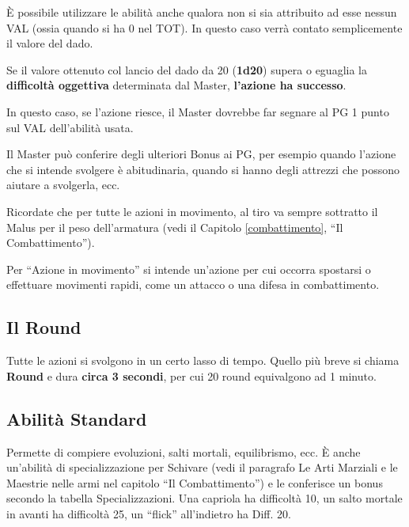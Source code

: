\bigskip
{}  

\`E possibile utilizzare le abilit\`a anche qualora non si sia
attribuito ad esse nessun VAL (ossia quando si ha 0 nel TOT). In
questo caso verr\`a contato semplicemente il valore del dado.
  
Se il valore ottenuto col lancio del dado da 20 (\textbf{1d20}) supera
o eguaglia la \textbf{difficolt\`a oggettiva} determinata dal Master,
\textbf{l'azione ha successo}.
  
In questo caso, se l'azione riesce, il Master dovrebbe far segnare al
PG 1 punto sul VAL dell'abilit\`a usata.

Il Master pu\`o conferire degli ulteriori Bonus ai PG, per esempio
quando l'azione che si intende svolgere \`e abitudinaria, quando si
hanno degli attrezzi che possono aiutare a svolgerla, ecc.

Ricordate che per tutte le azioni in movimento, al tiro va sempre
sottratto il Malus per il peso dell'armatura (vedi il Capitolo
\ref{combattimento}, ``Il Combattimento'').

Per ``Azione in movimento'' si intende un'azione per cui occorra
spostarsi o effettuare movimenti rapidi, come un attacco o una difesa
in combattimento.

\subsection{Il Round}

Tutte le azioni si svolgono in un certo lasso di tempo. Quello pi\`u
breve si chiama \textbf{Round} e dura \textbf{circa 3 secondi}, per
cui 20 round equivalgono ad 1 minuto. 

\subsection{Abilit\`a Standard}

\iffullversion
{} Permette di compiere evoluzioni, salti
mortali, equilibrismo, ecc. \`E anche un'abilit\`a di specializzazione
per Schivare (vedi il paragrafo Le Arti Marziali e le Maestrie nelle
armi nel capitolo ``Il Combattimento'') e le conferisce un bonus
secondo la tabella Specializzazioni. Una capriola ha difficolt\`a 10,
un salto mortale in avanti ha difficolt\`a 25, un ``flick''
all'indietro ha Diff. 20.

